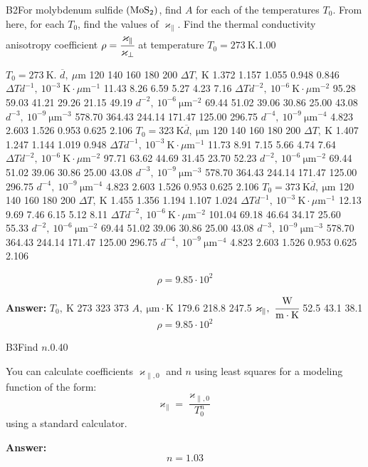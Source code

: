 \documentclass[11pt,a4paper]{article}
\begin{document}
\begin{solcard}{B2}{For molybdenum sulfide $\rm(MoS_2)$, find $A$ for each of the temperatures $T_0$. From here, for each $T_0$, find the values of $\varkappa_\parallel$. Find the thermal conductivity anisotropy coefficient $\rho=\cfrac{\varkappa_\parallel}{\varkappa_\perp}$ at temperature $T_0=273\ \mathrm{K}$.}{1.00}

$T_0=273~\mathrm{K}$. $\overline{d},~\mu\text{m}$ 120 140 160 180 200 $\Delta T,~\mathrm{K}$ 1.372 1.157 1.055 0.948 0.846 $\Delta Td^{-1},~10^{-3}~\mathrm{K}\cdot\mu\text{m}^{-1}$ 11.43 8.26 6.59 5.27 4.23 7.16 $\Delta Td^{-2},~10^{-6}~\mathrm{K}\cdot\mu\text{m}^{-2}$ 95.28 59.03 41.21 29.26 21.15 49.19 $d^{-2},~10^{-6}~\mathrm{\mu m}^{-2}$ 69.44 51.02 39.06 30.86 25.00 43.08 $d^{-3},~10^{-9}~\mathrm{\mu m}^{-3}$ 578.70 364.43 244.14 171.47 125.00 296.75 $d^{-4},~10^{-9}~\mathrm{\mu m}^{-4}$ 4.823 2.603 1.526 0.953 0.625 2.106 $T_0=323~\mathrm{K}\overline{d},~\mathrm{\mu m}$ 120 140 160 180 200 $\Delta T,~\mathrm{K}$ 1.407 1.247 1.144 1.019 0.948 $\Delta Td^{-1},~10^{-3}~\mathrm{K}\cdot\mu\text{m}^{-1}$ 11.73 8.91 7.15 5.66 4.74 7.64 $\Delta Td^{-2},~10^{-6}~\mathrm{K}\cdot\mu\text{m}^{-2}$ 97.71 63.62 44.69 31.45 23.70 52.23 $d^{-2},~10^{-6}~\mathrm{\mu m}^{-2}$ 69.44 51.02 39.06 30.86 25.00 43.08 $d^{-3},~10^{-9}~\mathrm{\mu m}^{-3}$ 578.70 364.43 244.14 171.47 125.00 296.75 $d^{-4},~10^{-9}~\mathrm{\mu m}^{-4}$ 4.823 2.603 1.526 0.953 0.625 2.106 $T_0=373~\mathrm{K}\overline{d},~\mathrm{\mu m}$ 120 140 160 180 200 $\Delta T,~\mathrm{K}$ 1.455 1.356 1.194 1.107 1.024 $\Delta Td^{-1},~10^{-3}~\mathrm{K}\cdot\mu\text{m}^{-1}$ 12.13 9.69 7.46 6.15 5.12 8.11 $\Delta Td^{-2},~10^{-6}~\mathrm{K}\cdot\mu\text{m}^{-2}$ 101.04 69.18 46.64 34.17 25.60 55.33 $d^{-2},~10^{-6}~\mathrm{\mu m}^{-2}$ 69.44 51.02 39.06 30.86 25.00 43.08 $d^{-3},~10^{-9}~\mathrm{\mu m}^{-3}$ 578.70 364.43 244.14 171.47 125.00 296.75 $d^{-4},~10^{-9}~\mathrm{\mu m}^{-4}$ 4.823 2.603 1.526 0.953 0.625 2.106


\[\rho=9.85\cdot10^2\]

\par\smallskip\noindent\textbf{Answer:} $T_0,~\mathrm{K}$ 273 323 373 $A,~\mathrm{\mu m}\cdot\text{K}$ 179.6 218.8 247.5 $\varkappa_\parallel,~\cfrac{\text{W}}{\text{m}\cdot\text{K}}$ 52.5 43.1 38.1 \[\rho=9.85\cdot10^2\]
\end{solcard}

\begin{solcard}{B3}{Find $n$.}{0.40}

You can calculate coefficients $\varkappa_{\parallel,0}$ and $n$ using least squares for a modeling function of the form: \[\varkappa_\parallel=\frac{\varkappa_{\parallel,0}}{T_0^n}\] using a standard calculator.

\par\smallskip\noindent\textbf{Answer:} \[n=1.03\]
\end{solcard}
\end{document}
